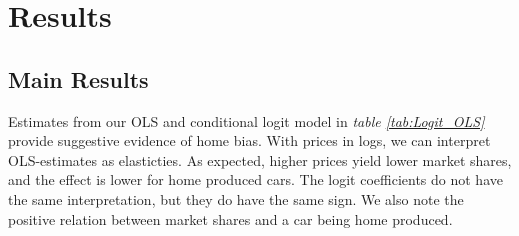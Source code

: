 \documentclass[11pt]{article}
\begin{document}

\section{Results}
\subsection{Main Results}
Estimates from our OLS and conditional logit model in \textit{table \ref{tab:Logit_OLS}} provide suggestive evidence of home bias. With prices in logs, we can interpret OLS-estimates as elasticties. As expected, higher prices yield lower market shares, and the effect is lower for home produced cars. The logit coefficients do not have the same interpretation, but they do have the same sign. We also note the positive relation between market shares and a car being home produced.
\end{document}
